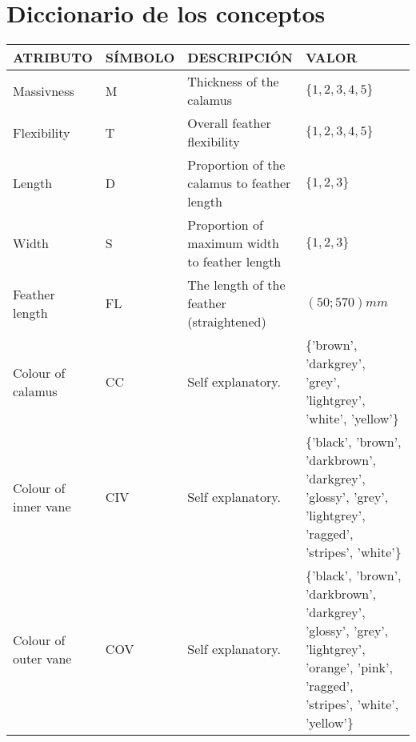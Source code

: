 \documentclass[a4paper,12pt]{article}
\begin{document}
\section{Diccionario de los conceptos}
\begin{table}[H]
	\centering
	\begin{tabular}{|p{0.2\linewidth}|p{0.15\linewidth}|p{0.25\linewidth}|p{0.4\linewidth}|}
		\hline
		ATRIBUTO                 & SÍMBOLO & DESCRIPCIÓN                                   & VALOR                                                                                                                                  \\ \hline\hline
		Massivness               & M       & Thickness of the calamus                      & $\{1,2,3,4,5\}$                                                                                                                        \\ \hline
		Flexibility              & T       & Overall feather flexibility                   & $\{1,2,3,4,5\}$                                                                                                                        \\ \hline
		Length                   & D       & Proportion of the calamus to feather length   & $\{1,2,3\}$                                                                                                                            \\ \hline
		Width                    & S       & Proportion of maximum width to feather length & $\{1,2,3\}$                                                                                                                            \\ \hline
		Feather length           & FL      & The length of the feather (straightened)      & $(50;570) mm$                                                                                                                          \\ \hline
		Colour of calamus        & CC      & Self explanatory.                             & \{'brown', 'darkgrey', 'grey', 'lightgrey', 'white', 'yellow'\}                                                                        \\ \hline
		Colour of inner vane     & CIV     & Self explanatory.                             & \{'black', 'brown', 'darkbrown', 'darkgrey', 'glossy', 'grey', 'lightgrey', 'ragged', 'stripes', 'white'\}                             \\ \hline
		Colour of outer vane     & COV     & Self explanatory.                             & \{'black', 'brown', 'darkbrown', 'darkgrey', 'glossy', 'grey', 'lightgrey', 'orange', 'pink', 'ragged', 'stripes', 'white', 'yellow'\} \\ \hline

\end{tabular}
\end{table}
\end{document}
